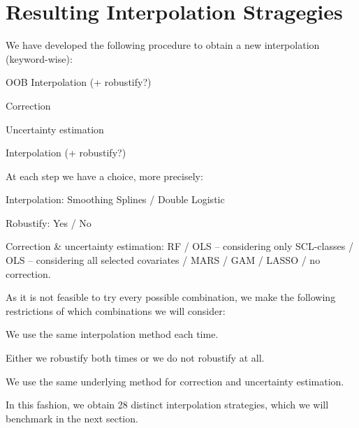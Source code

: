 \section{Resulting Interpolation Stragegies}{
    \label{sec:corr_itpl_stat}
    We have developed the following procedure to obtain a new interpolation (keyword-wise):
    \begin{Nenumerate}
        \item OOB Interpolation (+ robustify?)
        \item Correction 
        \item Uncertainty estimation
        \item Interpolation (+ robustify?)
    \end{Nenumerate}
    At each step we have a choice, more precisely:
    \begin{Nitemize}
        \item Interpolation: Smoothing Splines / Double Logistic
        \item Robustify: Yes / No
        \item Correction \& uncertainty estimation: RF / OLS -- considering only SCL-classes / OLS -- considering all selected covariates / MARS / GAM / LASSO / no correction.
    \end{Nitemize}
    As it is not feasible to try every possible combination, we make the following restrictions of which combinations we will consider:
    \begin{Nitemize}
        \item We use the same interpolation method each time.
        \item Either we robustify both times or we do not robustify at all.
        \item We use the same underlying method for correction and uncertainty estimation.
    \end{Nitemize}

    In this fashion, we obtain 28 distinct interpolation strategies, which we will benchmark in the next section.
}

